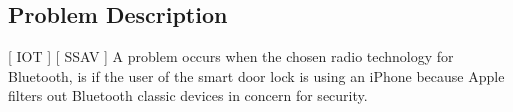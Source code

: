 \subsection{Problem Description}
[ IOT ] [ SSAV ] \newline
A problem occurs when the chosen radio technology for Bluetooth, is if the user of the smart door lock is using an iPhone because Apple filters out Bluetooth classic devices in concern for security. 
